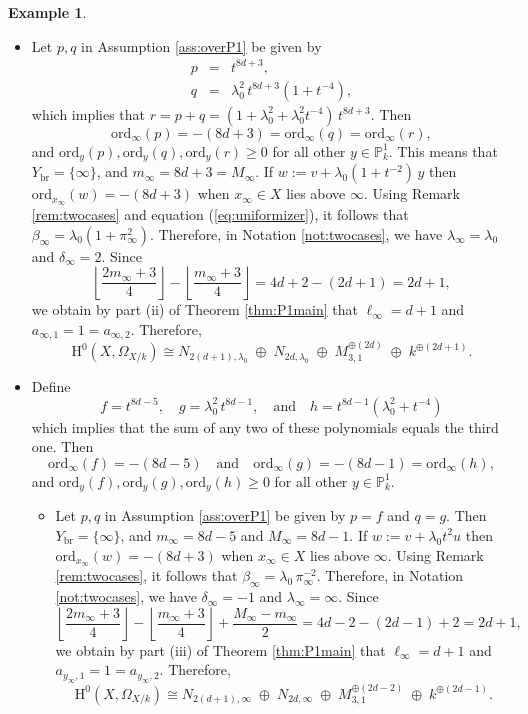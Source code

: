 \documentclass{amsart}
\numberwithin{equation}{section}
\numberwithin{table}{section}
\theoremstyle{plain}
\theoremstyle{definition}
\newtheorem{example}[theorem]{Example}
\theoremstyle{remark}
\newcommand{\HH}{\mathrm{H}}
\begin{document}
\begin{example}
\begin{itemize}
\item[(1)] Let $p,q$ in Assumption \ref{ass:overP1} be given by
\begin{eqnarray*}
p&=&t^{8d+3},\\
q&=&\lambda_0^2 \,t^{8d+3} (1+t^{-4}),
\end{eqnarray*}
which implies that $r=p+q = (1+\lambda_0^2+\lambda_0^2t^{-4})\,t^{8d+3}$. Then
$$\mathrm{ord}_{\infty}(p) = -(8d+3) = \mathrm{ord}_{\infty}(q) = \mathrm{ord}_{\infty}(r),$$
and $\mathrm{ord}_y(p),\mathrm{ord}_y(q),\mathrm{ord}_y(r)\ge 0$ for all other $y\in\mathbb{P}^1_k$. This means that $Y_{\mathrm{br}}=\{\infty\}$, and $m_{\infty}=8d+3=M_{\infty}$. If $w:=v+  \lambda_0 (1+t^{-2})\,y$ then 
$\mathrm{ord}_{x_\infty}(w) = -(8d+3)$
when $x_\infty\in X$ lies above $\infty$. 
Using Remark \ref{rem:twocases} and equation (\ref{eq:uniformizer}), it follows that $\beta_{\infty} = \lambda_0 (1+\pi_{\infty}^2)$. Therefore, in Notation \ref{not:twocases}, we have $\lambda_{\infty}=\lambda_0$ and $\delta_{\infty}=2$. Since
$$\textstyle\left\lfloor \frac{2m_{\infty}+3}{4}\right\rfloor - \left\lfloor \frac{m_{\infty}+3}{4}\right\rfloor = 4d+2-(2d+1)=2d+1,$$
we obtain by part (ii) of Theorem \ref{thm:P1main} that $\ell_{\infty}=d+1$ and $a_{\infty,1}=1=a_{\infty,2}$. Therefore,
$$\HH^0(X,\Omega_{X/k})\cong  N_{2(d+1),\lambda_0} \;\oplus\; N_{2d,\lambda_0} \;\oplus\; M_{3,1}^{\oplus (2d)} \;\oplus\; k^{\oplus (2d+1)}.$$

\item[(2)] Define
$$f=t^{8d-5}, \quad  g=\lambda_0^2\,t^{8d-1}, \quad \mbox{and} \quad h=t^{8d-1}(\lambda_0^2+t^{-4})$$
which implies that the sum of any two of these polynomials equals the third one. Then
$$\mathrm{ord}_{\infty}(f) = -(8d-5) \quad\mbox{and}\quad  \mathrm{ord}_{\infty}(g) = -(8d-1) = \mathrm{ord}_{\infty}(h),$$
and $\mathrm{ord}_y(f),\mathrm{ord}_y(g),\mathrm{ord}_y(h)\ge 0$ for all other $y\in\mathbb{P}^1_k$.

\begin{itemize}
\item[(a)] Let $p,q$ in Assumption \ref{ass:overP1} be given by $p=f$ and $q=g$. Then $Y_{\mathrm{br}}=\{\infty\}$, and $m_{\infty}=8d-5$ and $M_{\infty}=8d-1$. If $w:=v+  \lambda_0 t^2u$ then 
$\mathrm{ord}_{x_\infty}(w) =-(8d+3)$
when $x_\infty\in X$ lies above $\infty$. Using Remark \ref{rem:twocases}, it follows that $\beta_{\infty} = \lambda_0 \,\pi_{\infty}^{-2}$. Therefore, in Notation \ref{not:twocases}, we have $\delta_{\infty}=-1$ and $\lambda_{\infty}=\infty$. Since
$$\textstyle \left\lfloor \frac{2m_{\infty}+3}{4}\right\rfloor - \left\lfloor \frac{m_{\infty}+3}{4}\right\rfloor +\frac{M_{\infty}-m_{\infty}}{2} = 4d-2-(2d-1) + 2 =2d+1,$$
we obtain by part (iii) of Theorem \ref{thm:P1main} that $\ell_{\infty}=d+1$ and $a_{y_\infty,1}=1=a_{y_\infty,2}$. Therefore,
$$\HH^0(X,\Omega_{X/k})\cong  N_{2(d+1),\infty} \;\oplus\; N_{2d,\infty} \;\oplus\; M_{3,1}^{\oplus (2d-2)} \;\oplus\; k^{\oplus (2d-1)}.$$


\end{itemize}
\end{itemize}
\end{example}
\end{document}
